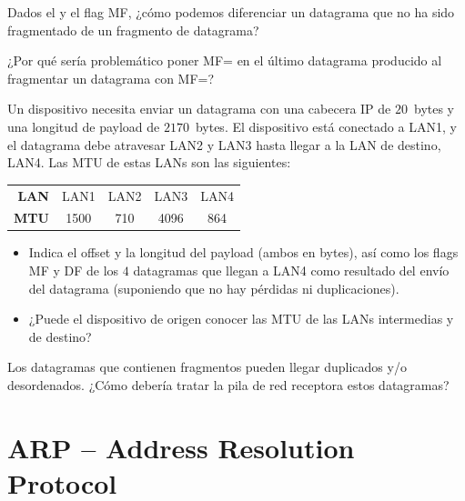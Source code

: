 \begin{exercise}
Dados el  y el flag MF, ¿cómo podemos diferenciar
un datagrama que no ha sido fragmentado de un fragmento de datagrama?
\end{exercise}

\begin{exercise}
¿Por qué sería problemático poner MF= en el último datagrama 
producido al fragmentar un datagrama con MF=?
\end{exercise}

\begin{exercise}
Un dispositivo necesita enviar un datagrama con una cabecera IP de $20$~bytes y una longitud de payload de $2170$~bytes.
El dispositivo está conectado a LAN1, y el datagrama debe atravesar 
LAN2 y LAN3 hasta llegar a la LAN de destino, LAN4. Las MTU de estas LANs son las siguientes:
\begin{center}
\begin{tabular}{r cccc}
\toprule
\textbf{LAN} & LAN1 & LAN2 & LAN3 & LAN4 \\
\textbf{MTU} & 1500 & 710  & 4096 & 864  \\
\bottomrule
\end{tabular}
\end{center}

\begin{itemize}
\item Indica el offset y la longitud del payload (ambos en bytes),
 así como los flags MF y DF de los $4$ datagramas
 que llegan a LAN4 como resultado del envío del datagrama
 (suponiendo que no hay pérdidas ni duplicaciones).
  
\item ¿Puede el dispositivo de origen conocer las MTU de las LANs intermedias y de 
destino?
\end{itemize}

\end{exercise}


\begin{exercise}
Los datagramas que contienen fragmentos pueden llegar duplicados y/o desordenados. 
¿Cómo debería tratar la pila de red receptora estos datagramas?
\end{exercise}


\section{ARP -- Address Resolution Protocol}\label{sec:layer3:arp}

